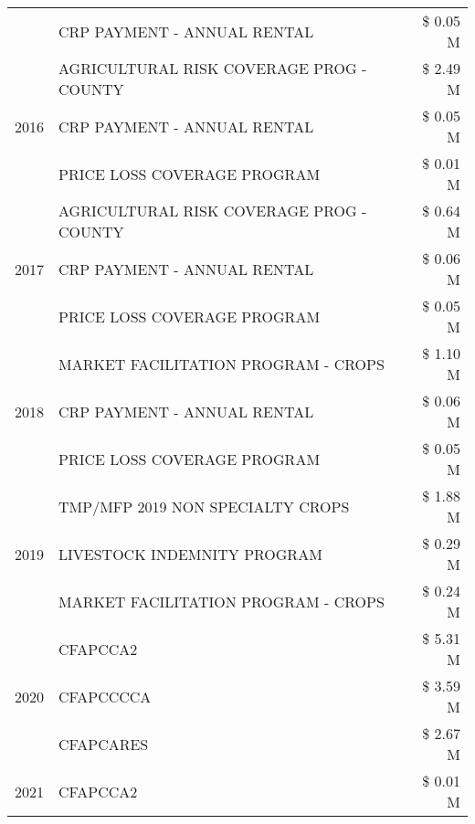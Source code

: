 \begin{tabular}{llr}
 & CRP PAYMENT - ANNUAL RENTAL & \$ 0.05 M \\
\cline{1-3}
\multirow[t]{3}{*}{2016} & AGRICULTURAL RISK COVERAGE PROG - COUNTY & \$ 2.49 M \\
 & CRP PAYMENT - ANNUAL RENTAL & \$ 0.05 M \\
 & PRICE LOSS COVERAGE PROGRAM & \$ 0.01 M \\
\cline{1-3}
\multirow[t]{3}{*}{2017} & AGRICULTURAL RISK COVERAGE PROG - COUNTY & \$ 0.64 M \\
 & CRP PAYMENT - ANNUAL RENTAL & \$ 0.06 M \\
 & PRICE LOSS COVERAGE PROGRAM & \$ 0.05 M \\
\cline{1-3}
\multirow[t]{3}{*}{2018} & MARKET FACILITATION PROGRAM - CROPS & \$ 1.10 M \\
 & CRP PAYMENT - ANNUAL RENTAL & \$ 0.06 M \\
 & PRICE LOSS COVERAGE PROGRAM & \$ 0.05 M \\
\cline{1-3}
\multirow[t]{3}{*}{2019} & TMP/MFP 2019 NON SPECIALTY CROPS & \$ 1.88 M \\
 & LIVESTOCK INDEMNITY PROGRAM & \$ 0.29 M \\
 & MARKET FACILITATION PROGRAM - CROPS & \$ 0.24 M \\
\cline{1-3}
\multirow[t]{3}{*}{2020} & CFAPCCA2 & \$ 5.31 M \\
 & CFAPCCCCA & \$ 3.59 M \\
 & CFAPCARES & \$ 2.67 M \\
\cline{1-3}
2021 & CFAPCCA2 & \$ 0.01 M \\
\cline{1-3}
\bottomrule
\end{tabular}
